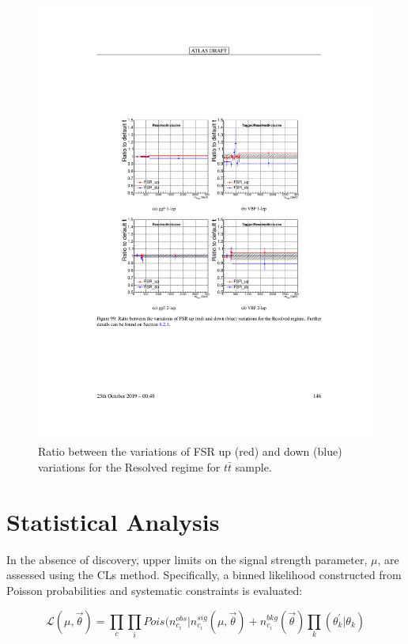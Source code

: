 \begin{figure}[h!]
  \centering
  \includegraphics[width=\hsize]{figures/Analysis/modelingsysts/ttbar_fsr_res.pdf}
            \caption{Ratio between the variations of FSR up (red) and down (blue) variations for the Resolved regime for $t\bar{t}$ sample.} 
  \label{fig:ttbar_fsr_res}
\end{figure} 
\FloatBarrier


\section{Statistical Analysis}
In the absence of discovery, upper limits on the signal strength parameter, $\mu$, are assessed using the CLs method. Specifically, a binned likelihood constructed from Poisson probabilities and systematic constraints is evaluated:

\begin{equation}
\mathcal{L}(\mu,\vec{\theta})=\prod_{c}\prod_{i}Pois(n^{obs}_{c_{i}}|n_{c_{i}}^{sig}(\mu,\vec{\theta})+n^{bkg}_{c_{i}}(\vec{\theta})\prod_{k}(\theta^{'}_{k}|\theta_{k})
\end{equation}

